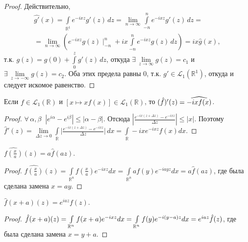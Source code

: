 \documentclass[12pt,titlepage, a4paper]{article}
\begin{document}
\begin{proof}
Действительно,
\begin{multline*}
\widehat{g'}(x)=\int\limits_{\mathbb{R}^1}\!e^{-ixz}g'(z)\,dz=\lim\limits_{n\to\infty}
\int\limits_{-n}^n\!e^{-ixz}g'(z)\,dz=\\=\lim\limits_{n\to\infty}\left(e^{-ixz}g(z)\mid_{-n}^n
+ix\int\limits_{-n}^n\!e^{-ixz}g(z)\,dz\right)=ix\hat{g}(x),
\end{multline*}
т.к. $g(z)=g(0)+\int\limits_{0}^z\!g'(z)\,dz$, откуда
$\exists\,\lim\limits_{z\to\infty}g(z)=c_1$ и
$\exists\,\lim\limits_{z\to-\infty}g(z)=c_2$. Оба этих предела равны
0, т.к. $g'\in\mathcal{L}_1(\mathbb{R}^1)$, откуда и следует искомое
равенство.
\end{proof}

\lecture


\begin{theorem}
Если $f\in \mathcal{L}_1(\mathbb{R})$ и $[x\mapsto xf(x)]\in
\mathcal{L}_1(\mathbb{R})$, то $(\hat f)'(z)\p=\widehat{-ixf(x)}$.
\end{theorem}

\begin{proof}
$\forall\, \alpha, \beta\;\; |e^{i\alpha}-e^{i\beta}|\leqslant
|\alpha-\beta|$. Отсюда $|\frac{e^{-ix(z+\Delta z)}-e^{-ixz}}{\Delta
z}|\leqslant |x|$. Поэтому $\hat f'(z)=\lim\limits_{\Delta z\to
0}\int\limits_{\mathbb{R}} \Big|\frac{e^{-ix(z+\Delta
z)}-e^{-ixz}}{\Delta
z}\Big|\,dx=\int\limits_{\mathbb{R}}-ixe^{-ixz}f(x)dx$.
\end{proof}


\begin{theorem}
$\widehat{f(\frac{x}{a})}(z)=a\hat f(az)$.
\end{theorem}

\begin{proof}
$\widehat{f(\frac{x}{a})}(z)=\int\limits_{\mathbb{R}^n}f(\frac{x}{a})e^{-ixz}dx=
\int\limits_{\mathbb{R}^n}af(y)e^{-iayz}dx=a\hat f(az)$, где была
сделана замена $x=ay$.
\end{proof}

\begin{theorem}
$\hat f(x+a)(z)=e^{iaz}f(z)$.
\end{theorem}

\begin{proof}
$\hat f(x+a)(z)=\int\limits_{\mathbb{R}^n}f(x+a)e^{-ixz}dx\p=
\int\limits_{\mathbb{R}^n}f(y)e^{-i(y-a)z}dx\p=e^{iaz}\hat f(z)$,
где была сделана замена $x=y+a$.
\end{proof}
\end{document}
